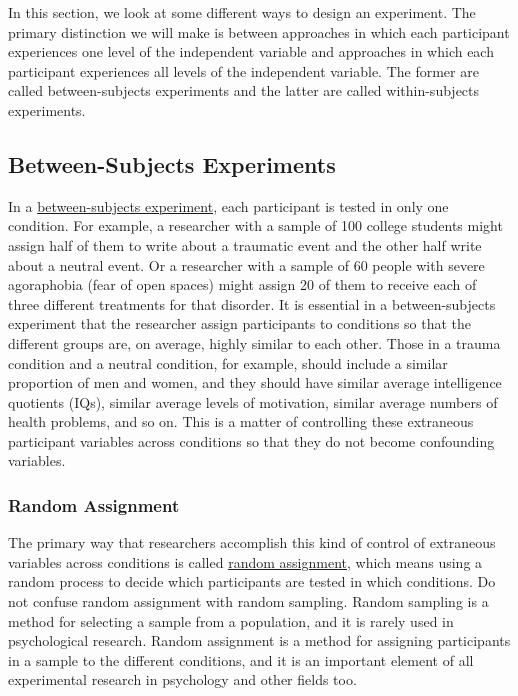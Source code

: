 \documentclass[
]{krantz}
\begin{document}
In this section, we look at some different ways to design an experiment. The primary distinction we will make is between approaches in which each participant experiences one level of the independent variable and approaches in which each participant experiences all levels of the independent variable. The former are called between-subjects experiments and the latter are called within-subjects experiments.

\hypertarget{between-subjects-experiments}{%
\subsection*{Between-Subjects Experiments}\label{between-subjects-experiments}}


In a \protect\hyperlink{between-subjects-experiment}{between-subjects experiment}, each participant is tested in only one condition. For example, a researcher with a sample of 100 college students might assign half of them to write about a traumatic event and the other half write about a neutral event. Or a researcher with a sample of 60 people with severe agoraphobia (fear of open spaces) might assign 20 of them to receive each of three different treatments for that disorder. It is essential in a between-subjects experiment that the researcher assign participants to conditions so that the different groups are, on average, highly similar to each other. Those in a trauma condition and a neutral condition, for example, should include a similar proportion of men and women, and they should have similar average intelligence quotients (IQs), similar average levels of motivation, similar average numbers of health problems, and so on. This is a matter of controlling these extraneous participant variables across conditions so that they do not become confounding variables.

\hypertarget{random-assignment}{%
\subsubsection*{Random Assignment}\label{random-assignment}}


The primary way that researchers accomplish this kind of control of extraneous variables across conditions is called \protect\hyperlink{random-assignment-1}{random assignment}, which means using a random process to decide which participants are tested in which conditions. Do not confuse random assignment with random sampling. Random sampling is a method for selecting a sample from a population, and it is rarely used in psychological research. Random assignment is a method for assigning participants in a sample to the different conditions, and it is an important element of all experimental research in psychology and other fields too.
\end{document}

